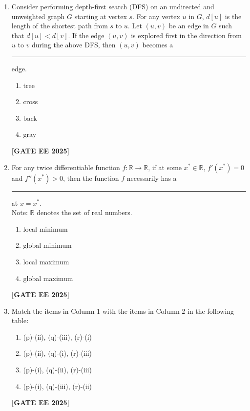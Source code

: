\documentclass[journal]{IEEEtran}
\newcommand{\qfooter}{%
  \begin{flushright}\footnotesize\textbf{[GATE EE 2025]}\end{flushright}\vspace{1em}%
}
\begin{document}
\begin{enumerate}[leftmargin=*,label=\arabic*.]
\item Consider performing depth-first search (DFS) on an undirected and unweighted graph $G$ starting at vertex $s$. For any vertex $u$ in $G$, $d[u]$ is the length of the shortest path from $s$ to $u$. Let $(u, v)$ be an edge in $G$ such that $d[u] < d[v]$. If the edge $(u, v)$ is explored first in the direction from $u$ to $v$ during the above DFS, then $(u, v)$ becomes a \rule{7em}{0.07em} edge.
\begin{multicols}{4}
\begin{enumerate}[label=(\Alph*)]
\item tree
\item cross
\item back
\item gray
\end{enumerate}
\qfooter
\end{multicols}

\item For any twice differentiable function $f: \mathbb{R} \rightarrow \mathbb{R}$, if at some $x^*\in \mathbb{R}$, $f'(x^*)=0$ and $f''(x^*)>0$, then the function $f$ necessarily has a \rule{7em}{0.07em} at $x = x^*$.\\
Note: $\mathbb{R}$ denotes the set of real numbers.
\begin{multicols}{2}
\begin{enumerate}[label=(\Alph*)]
\item local minimum
\item global minimum
\item local maximum
\item global maximum
\end{enumerate} \qfooter
\end{multicols}

\item Match the items in Column 1 with the items in Column 2 in the following table:

\begin{multicols}{2}
\begin{enumerate}[label=(\Alph*)]
\item (p)-(ii), (q)-(iii), (r)-(i)
\item (p)-(ii), (q)-(i), (r)-(iii)
\item (p)-(i), (q)-(ii), (r)-(iii)
\item (p)-(i), (q)-(iii), (r)-(ii)
\end{enumerate} \qfooter
\end{multicols}


\end{enumerate}
\end{document}
